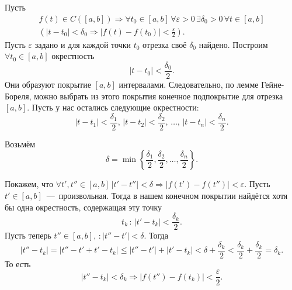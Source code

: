 Пусть
\begin{gather*}
  f \left( t \right) \in C \left( \left[ a, b \right] \right) \Rightarrow
  \forall t_0 \in \left[ a, b \right] \,
  \forall \varepsilon > 0 \,
  \exists \delta_0 > 0 \,
  \forall t \in \left[ a, b \right] \\
  \left(
    \left| t - t_0 \right| < \delta_0 \Rightarrow
    \left| f \left( t \right) - f \left( t_0 \right) \right| < \frac{ \varepsilon }{2} \right).
\end{gather*}
Пусть $ \varepsilon $ задано и для каждой точки $t_0$ отрезка своё $ \delta_0 $ найдено.
Построим $ \forall t_0 \in \left[ a, b \right] $ окрестность
\begin{equation*}
  \left| t - t_0 \right| <
  \frac{ \delta_0}{2}.
\end{equation*}
Они образуют покрытие $ \left[ a, b \right] $ интервалами.
Следовательно, по лемме Гейне-Бореля,
можно выбрать из этого покрытия конечное подпокрытие для отрезка $ \left[ a, b \right] $.
Пусть у нас остались следующие окрестности:
\begin{equation*}
  \left| t - t_1 \right| < \frac{ \delta_1}{2}, \,
  \left| t - t_2 \right| < \frac{ \delta_2}{2}, \,
  \dotsc, \,
  \left| t - t_n \right| < \frac{ \delta_n}{2}.
\end{equation*}

Возьмём
\begin{equation*}
  \delta =
  \min \left\{ \frac{ \delta_1}{2}, \frac{ \delta_2}{2}, \dotsc, \frac{ \delta_n}{2} \right\}.
\end{equation*}

Покажем, что
$ \forall t', t'' \in \left[ a, b \right] \,
  \left| t' - t'' \right| < \delta \Rightarrow
  \left| f \left( t' \right) - f \left( t'' \right) \right| < \varepsilon $.
Пусть $t' \in \left[ a, b \right] $~---~произвольная.
Тогда в нашем конечном покрытии найдётся хотя бы одна окрестность, содержащая эту точку
\begin{equation*}
  t_k \, : \,
  \left| t' - t_k \right| < \frac{ \delta_k}{2}.
\end{equation*}
Пусть теперь $t'' \in \left[ a, b \right] , \, : \left| t'' - t' \right| < \delta $.
Тогда
\begin{equation*}
  \left| t'' - t_k \right| =
  \left| t'' - t' + t' - t_k \right| \leq
  \left| t'' - t' \right| + \left| t' - t_k \right| <
  \delta + \frac{ \delta_k}{2} <
  \frac{ \delta_k}{2} + \frac{ \delta_k}{2} =
  \delta_k.
\end{equation*}
То есть
\begin{equation*}
  \left| t'' - t_k \right| < \delta_k \Rightarrow
  \left| f \left( t'' \right) - f \left( t_k \right) \right| < \frac{ \varepsilon }{2}.
\end{equation*}

